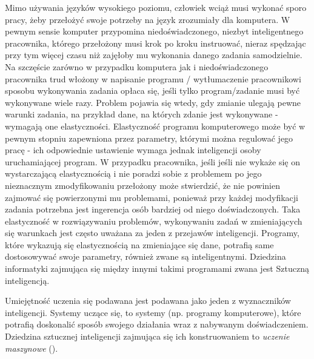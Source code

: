 Mimo używania języków wysokiego poziomu, człowiek wciąż musi wykonać sporo pracy, żeby przełożyć swoje potrzeby na język zrozumiały dla komputera. W pewnym sensie komputer przypomina niedoświadczonego, niezbyt inteligentnego pracownika, którego przełożony musi krok po kroku instruować, nieraz spędzając przy tym więcej czasu niż zajęłoby mu wykonania danego zadania samodzielnie. Na szczęście zarówno w przypadku komputera jak i niedoświadczonego pracownika trud włożony w napisanie programu / wytłumaczenie pracownikowi sposobu wykonywania zadania opłaca się, jeśli tylko program/zadanie musi być wykonywane wiele razy. Problem pojawia się wtedy, gdy zmianie ulegają pewne warunki zadania, na przykład dane, na których zdanie jest wykonywane - wymagają one elastyczności. Elastyczność programu komputerowego może być w pewnym stopniu zapewniona przez parametry, którymi można regulować jego pracę - ich odpowiednie ustawienie wymaga jednak inteligencji osoby uruchamiającej program. W przypadku pracownika, jeśli jeśli nie wykaże się on wystarczającą elastycznością i nie poradzi sobie z problemem po jego nieznacznym zmodyfikowaniu przełożony może stwierdzić, że nie powinien zajmować się powierzonymi mu problemami, ponieważ przy każdej modyfikacji zadania potrzebna jest ingerencja osób bardziej od niego doświadczonych. Taka elastyczność w rozwiązywaniu problemów, wykonywaniu zadań w zmieniających się warunkach jest często uważana za jeden z przejawów inteligencji. Programy, które wykazują się elastycznością na zmieniające się dane, potrafią same dostosowywać swoje parametry, również zwane są inteligentnymi. Dziedzina informatyki zajmująca się między innymi takimi programami zwana jest Sztuczną inteligencją.

Umiejętność uczenia się podawana jest podawana jako jeden z wyznaczników inteligencji. Systemy uczące się, to systemy (np. programy komputerowe), które potrafią doskonalić sposób swojego działania wraz z nabywanym doświadczeniem. Dziedzina sztucznej inteligencji zajmująca się ich konstruowaniem to \emph{uczenie maszynowe} (). 

%
%
%
%
%
%



